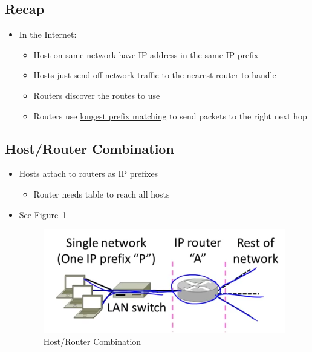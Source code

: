 \documentclass[12pt]{ctexart}   %
\begin{document}
	\subsection{Recap}
	\begin{itemize}
		\item In the Internet:
		\begin{itemize}
			\item Host on same network have IP address in the same \underline{IP prefix}
			\item Hosts just send off-network traffic to the nearest router to handle
			\item Routers discover the routes to use
			\item Routers use \underline{longest prefix matching} to send packets to the right next hop
		\end{itemize}
	\end{itemize}
	
	\subsection{Host/Router Combination}
	\begin{itemize}
		\item Hosts attach to routers as IP prefixes
		\begin{itemize}
			\item Router needs table to reach all hosts
		\end{itemize}
		\item See Figure~\ref{fig:5-8-1}
			
		\begin{figure}[h!] %
		\centering
		 \includegraphics[scale=0.7]{images/5-8-1}
		\caption{ Host/Router Combination }
		 \label{fig:5-8-1}
		 \end{figure}
	\end{itemize}
	
\end{document}
